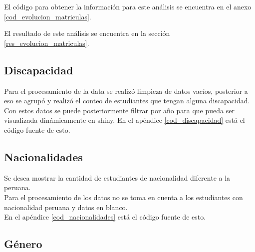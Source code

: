El código para obtener la información para este análisis se encuentra en el anexo \ref{cod_evolucion_matriculas}.

El resultado de este análisis se encuentra en la sección \ref{res_evolucion_matriculas}.

\subsection{Discapacidad}

Para el procesamiento de la data se realizó limpieza de datos vacíos, posterior a eso se agrupó y realizó el conteo de estudiantes que tengan alguna discapacidad.\\
Con estos datos se puede posteriormente filtrar por año para que pueda ser visualizada dinámicamente en shiny. En el apéndice \ref{cod_discapacidad} está el código fuente de esto.

\subsection{Nacionalidades}

Se desea mostrar la cantidad de estudiantes de nacionalidad diferente a la peruana.\\
Para el procesamiento de los datos no se toma en cuenta a los estudiantes con nacionalidad peruana y datos en blanco.\\
En el apéndice \ref{cod_nacionalidades} está el código fuente de esto.

\subsection{Género}

